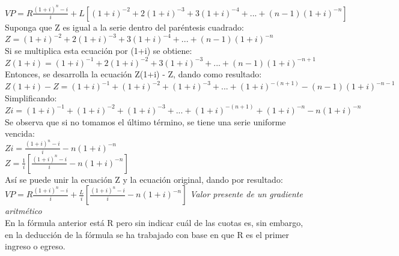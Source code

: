 $VP=R\frac{(1+i)^n-i}{i} + L[(1+i)^{-2} + 2(1+i)^{-3} + 3(1+i)^{-4} + ... + (n-1)(1+i)^{-n}]$ \\
	
	Suponga que Z es igual a la serie dentro del paréntesis cuadrado: \\
	
$Z = (1+i)^{-2} + 2(1+i)^{-3} + 3(1+i)^{-4} + ... + (n-1)(1+i)^{-n}$ \\
	
	Si se multiplica esta ecuación por (1+i) se obtiene: \\
	
$Z(1+i) = (1+i)^{-1} + 2(1+i)^{-2} + 3(1+i)^{-3} + ... + (n-1)(1+i)^{-n+1}$ \\
	
	Entonces, se desarrolla la ecuación Z(1+i) - Z, dando como resultado: \\
	
$Z(1+i) - Z = (1+i)^{-1} + (1+i)^{-2} + (1+i)^{-3} + ... + (1+i)^{-(n+1)} - (n-1)(1+i)^{-n-1}$ \\
	
	Simplificando: \\
	
$Zi = (1+i)^{-1} + (1+i)^{-2} + (1+i)^{-3} + ... + (1+i)^{-(n+1)} +  (1+i)^{-n} - n(1+i)^{-n}$ \\
	
	Se observa que si no tomamos el último término, se tiene una serie uniforme vencida:\\
	
$Zi = \frac{(1+i)^n-i}{i} - n(1+i)^{-n} $\\
	
$Z = \frac{1}{i}[\frac{(1+i)^n-i}{i} - n(1+i)^{-n}]$\\
	
	Así se puede unir la ecuación Z y la ecuación original, dando por resultado:\\
	
	
$VP=R\frac{(1+i)^n-i}{i}+\frac{L}{i}[\frac{(1+i)^n-i}{i}-n(1+i)^{-n}]$\hspace{35 pt} \textit{Valor presente de un gradiente aritmético}\\
	
	En la fórmula anterior está R pero sin indicar cuál de las cuotas es, sin embargo, en la deducción de la fórmula se ha trabajado con base en que R es el primer ingreso o egreso. \\




	
